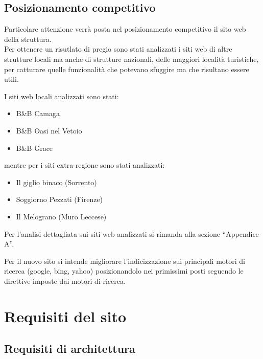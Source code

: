 \documentclass[a4paper,12pt,hidelinks]{report}
\begin{document}
\section{Posizionamento competitivo}
  Particolare attenzione verrà posta nel posizionamento competitivo il sito web della struttura.
  \\Per ottenere un risutlato di pregio sono stati analizzati i siti web di altre strutture locali ma anche di strutture nazionali, delle maggiori località turistiche, 
  per catturare quelle funzionalità che potevano sfuggire ma che risultano essere utili.
  \par I siti web locali analizzati sono stati:
  \begin{itemize}
    \item B\&B Camaga
    \item B\&B Oasi nel Vetoio
    \item B\&B Grace
  \end{itemize}
  mentre per i siti extra-regione sono stati analizzati:
  \begin{itemize}
    \item Il giglio binaco (Sorrento)
    \item Soggiorno Pezzati (Firenze)
    \item Il Melograno (Muro Leccese)
  \end{itemize}
  Per l'analisi dettagliata sui siti web analizzati si rimanda alla sezione ``Appendice A''.
  \par Per il nuovo sito si intende migliorare l'indicizzazione sui principali motori di ricerca (google, bing, yahoo) posizionandolo nei primissimi posti 
  seguendo le direttive imposte dai motori di ricerca.

\chapter{Requisiti del sito}

\section{Requisiti di architettura}
\end{document}
